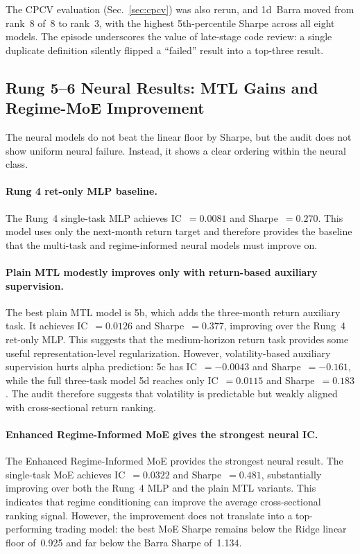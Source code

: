\documentclass[11pt]{article}
\begin{document}
The CPCV evaluation (Sec.~\ref{sec:cpcv}) was also rerun, and 1d~Barra
moved from rank~8 of~8 to rank~3, with the highest 5th-percentile
Sharpe across all eight models. The episode underscores the value of
late-stage code review: a single duplicate definition silently
flipped a ``failed'' result into a top-three result.

\subsection{Rung 5--6 Neural Results: MTL Gains and Regime-MoE Improvement}
\label{subsec:rung56-results}

The neural models do not beat the linear floor by Sharpe, but the audit
does not show uniform neural failure. Instead, it shows a clear ordering
within the neural class.

\paragraph{Rung 4 ret-only MLP baseline.}
The Rung~4 single-task MLP achieves IC~$=0.0081$ and Sharpe~$=0.270$.
This model uses only the next-month return target and therefore provides
the baseline that the multi-task and regime-informed neural models must
improve on.

\paragraph{Plain MTL modestly improves only with return-based auxiliary supervision.}
The best plain MTL model is 5b, which adds the three-month return
auxiliary task. It achieves IC~$=0.0126$ and Sharpe~$=0.377$, improving
over the Rung~4 ret-only MLP. This suggests that the medium-horizon
return task provides some useful representation-level regularization.
However, volatility-based auxiliary supervision hurts alpha prediction:
5c has IC~$=-0.0043$ and Sharpe~$=-0.161$, while the full three-task
model 5d reaches only IC~$=0.0115$ and Sharpe~$=0.183$. The audit
therefore suggests that volatility is predictable but weakly aligned
with cross-sectional return ranking.

\paragraph{Enhanced Regime-Informed MoE gives the strongest neural IC.}
The Enhanced Regime-Informed MoE provides the strongest neural result.
The single-task MoE achieves IC~$=0.0322$ and Sharpe~$=0.481$,
substantially improving over both the Rung~4 MLP and the plain MTL
variants. This indicates that regime conditioning can improve the
average cross-sectional ranking signal. However, the improvement does
not translate into a top-performing trading model: the best MoE Sharpe
remains below the Ridge linear floor of~0.925 and far below the Barra
Sharpe of~1.134.
\end{document}
